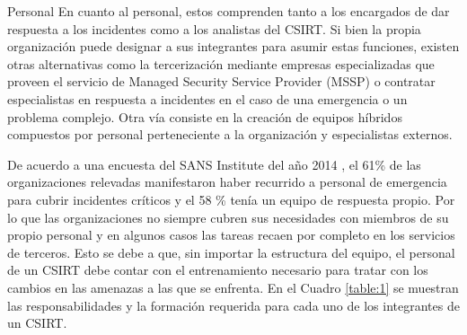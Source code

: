   \begin{section}{Personal}  
   En cuanto al personal, estos comprenden tanto a los encargados de dar respuesta a los incidentes como a los analistas del CSIRT. Si bien la propia organización puede designar a sus integrantes para asumir estas funciones, existen otras alternativas como la tercerización mediante empresas especializadas que proveen el servicio de Managed Security Service Provider (MSSP) o contratar especialistas en respuesta a incidentes en el caso de una emergencia o un problema complejo. Otra vía consiste en la creación de equipos híbridos compuestos por personal perteneciente a la organización y especialistas externos. \par
    De acuerdo a una encuesta del SANS Institute del año 2014 \cite{sans_1}, el 61\% de las organizaciones relevadas manifestaron haber recurrido a personal de emergencia para cubrir incidentes críticos y el 58 \% tenía un equipo de respuesta propio. Por lo que las organizaciones no siempre cubren sus necesidades con miembros de su propio personal y en algunos casos las tareas recaen por completo en los servicios de terceros. Esto se debe a que, sin importar la estructura del equipo, el personal de un CSIRT debe contar con el entrenamiento necesario para tratar con los cambios en las amenazas a las que se enfrenta. En el Cuadro \ref{table:1} se muestran las responsabilidades y la formación requerida para cada uno de los integrantes de un CSIRT. \par
    

\end{section}
